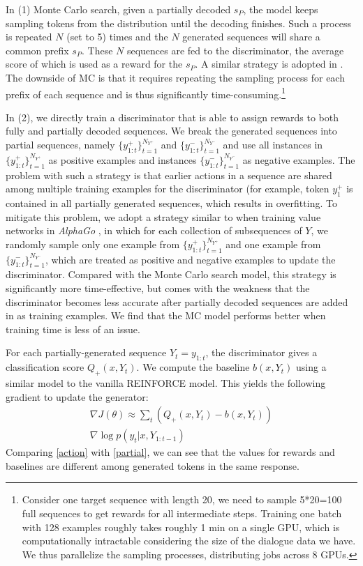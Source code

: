 In (1) Monte Carlo search, given a partially decoded $s_P$, the model 
keeps sampling tokens from the distribution
 until the decoding finishes. Such a process is repeated $N$ (set to 5) times and the $N$ generated   sequences will share  a common prefix $s_P$.
These $N$ sequences 
are fed to the discriminator, the average score of which is used as a reward for the $s_P$. A similar strategy is adopted in . 
The downside of MC is that 
it requires repeating the sampling process for each prefix of each sequence  and is thus significantly time-consuming.\footnote{Consider one target sequence with length 20, we need to sample 5*20=100 full sequences to get rewards for all intermediate steps. Training one batch with 128 examples roughly takes roughly 1 min on a single GPU, which is computationally intractable considering the size of the dialogue data we have. We thus parallelize the sampling processes, distributing jobs across 8 GPUs. }


In (2), we directly train a discriminator that is able to assign rewards to both fully and partially decoded sequences. 
We break 
the generated sequences into partial sequences, namely 
$\{y^+_{1:t}\}_{t=1}^{N_{Y^+}}$ and $\{y^-_{1:t}\}_{t=1}^{N_{Y^-}}$
 and use 
 all instances in  $\{y^+_{1:t}\}_{t=1}^{N_{Y^+}}$ as positive examples and  instances  $\{y^-_{1:t}\}_{t=1}^{N_{Y^-}}$ as negative examples. 
The problem with such a strategy is that earlier actions in a sequence are 
shared among multiple training examples for
 the discriminator 
(for example, token $y^+_1$ is contained in all partially generated sequences, which results in overfitting. 
To mitigate this problem, 
we adopt a  strategy similar to when training value networks in  {\it AlphaGo} \cite{silver2016mastering}, in which 
for each collection of subsequences of $Y$, we randomly sample only one example from $\{y^+_{1:t}\}_{t=1}^{N_{Y^+}}$ and one example from $\{y^-_{1:t}\}_{t=1}^{N_{Y^-}}$, which are treated as positive and negative examples
to update the discriminator. 
Compared with the Monte Carlo search model, this strategy is significantly more time-effective, but comes with the weakness that the discriminator becomes less accurate  after partially decoded sequences are added in as training examples. 
We find that the MC model performs better when training time is less of an issue. 


For each partially-generated sequence $Y_t=y_{1:t}$, the discriminator gives a classification score $Q_+(x,Y_t)$. 
We compute the baseline $b(x,Y_t)$
using a similar model  to the vanilla REINFORCE model. 
This yields the following gradient to update the generator:
 \begin{multline}
\nabla J(\theta)\approx \sum_t  (Q_+(x,Y_t)-b(x,Y_t))  \\
\nabla\log p(y_t|x,Y_{1:t-1})
\label{action}
\end{multline}
Comparing \eqref{action} with \eqref{partial}, we can see that
the values for  
rewards and baselines are different among generated tokens in the same response. 


